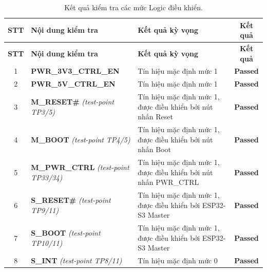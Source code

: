         \begin{longtable}{|c|p{5.5cm}|p{6.5cm}|c|}
            \caption{Kết quả kiểm tra các mức Logic điều khiển.}
            \label{tab:logic_verification} \\
            \hline
            \textbf{STT} & \textbf{Nội dung kiểm tra} & \textbf{Kết quả kỳ vọng} & \textbf{Kết quả} \\ \hline
            \endfirsthead
        
            \hline
            \textbf{STT} & \textbf{Nội dung kiểm tra} & \textbf{Kết quả kỳ vọng} & \textbf{Kết quả} \\ \hline
            \endhead
        
            \hline
            \endfoot
            \endlastfoot
        
            1 & \textbf{PWR\_3V3\_CTRL\_EN} & Tín hiệu mặc định mức 1 & \textcolor{modern_blue}{\textbf{Passed}} \\ \hline
            2 & \textbf{PWR\_5V\_CTRL\_EN} & Tín hiệu mặc định mức 1 & \textcolor{modern_blue}{\textbf{Passed}} \\ \hline
            3 & \textbf{M\_RESET\#} \newline \textit{(test-point TP3/5)} & Tín hiệu mặc định mức 1, được điều khiển bởi nút nhấn Reset & \textcolor{modern_blue}{\textbf{Passed}} \\ \hline
            4 & \textbf{M\_BOOT} \newline \textit{(test-point TP4/5)} & Tín hiệu mặc định mức 1, được điều khiển bởi nút nhấn Boot & \textcolor{modern_blue}{\textbf{Passed}} \\ \hline
            5 & \textbf{M\_PWR\_CTRL} \newline \textit{(test-point TP33/34)} & Tín hiệu mặc định mức 1, được điều khiển bởi nút nhấn PWR\_CTRL & \textcolor{modern_blue}{\textbf{Passed}} \\ \hline
            6 & \textbf{S\_RESET\#} \newline \textit{(test-point TP9/11)} & Tín hiệu mặc định mức 1, được điều khiển bởi ESP32-S3 Master & \textcolor{modern_blue}{\textbf{Passed}} \\ \hline
            7 & \textbf{S\_BOOT} \newline \textit{(test-point TP10/11)} & Tín hiệu mặc định mức 1, được điều khiển bởi ESP32-S3 Master & \textcolor{modern_blue}{\textbf{Passed}} \\ \hline
            8 & \textbf{S\_INT} \newline \textit{(test-point TP8/11)} & Tín hiệu mặc định mức 0 & \textcolor{modern_blue}{\textbf{Passed}} \\ \hline

\end{longtable}
